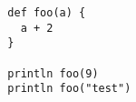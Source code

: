 {\tiny \begin{verbatim}
  def foo(a) {
    a + 2
  }

  println foo(9)
  println foo("test")
\end{verbatim} }
